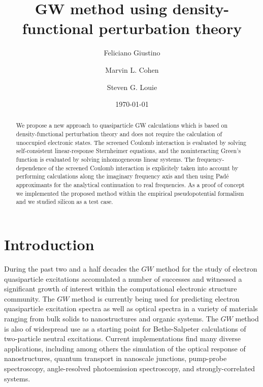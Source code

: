 \documentclass[twocolumn,prb,showpacs,superscriptaddress]{revtex4}
\begin{document}
\title{GW method using density-functional perturbation theory}

\author{Feliciano Giustino}
\author{Marvin L. Cohen}
\author{Steven G. Louie}
\date{\today}

\begin{abstract}
We propose a new approach to quasiparticle GW calculations which 
is based on density-functional perturbation theory and
does not require the calculation of unoccupied electronic states. The screened Coulomb interaction
is evaluated by solving self-consistent linear-response Sternheimer equations,
and the noninteracting Green's function is evaluated by solving inhomogeneous 
linear systems. The frequency-dependence of the screened Coulomb interaction 
is explicitely taken into account by performing calculations along the imaginary
frequency axis and then using Pad\'e approximants for the analytical continuation
to real frequencies. As a proof of concept we implemented the proposed method 
within the empirical pseudopotential formalism and we studied silicon as a test case. 
\end{abstract}


\maketitle

\section{Introduction}

During the past two and a half decades the $GW$ method\cite{hedin1,hl86}
for the study of electron quasiparticle excitations
accomulated a number of successes and witnessed a significant growth of interest
within the computational electronic structure community.
The $GW$ method is currently being used for predicting electron quasiparticle
excitation spectra as well as optical spectra in a variety of materials
ranging from bulk solids to nanostructures and organic systems. The
$GW$ method is also of widespread use as a starting point for Bethe-Salpeter calculations
of two-particle neutral excitations.\cite{onida,rolfing,reining-review}
Current implementations find many diverse applications,
including among others the simulation of the optical response of nanostructures,\cite{catalin} quantum transport in nanoscale
junctions,\cite{rubio} pump-probe spectroscopy,\cite{catalin-lw} angle-resolved photoemission
spectroscopy,\cite{cheolhwan} and strongly-correlated systems.\cite{bruneval-oxide}
\end{document}
